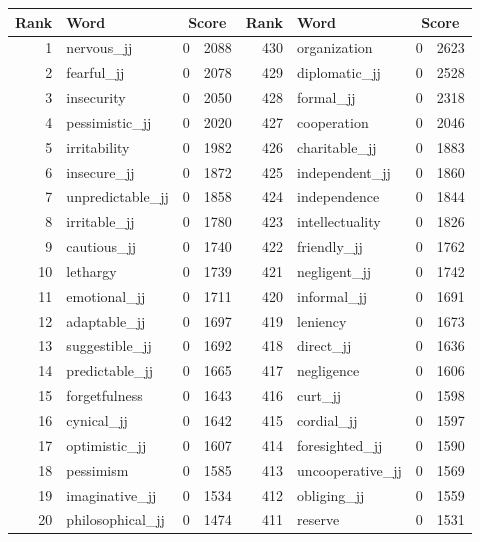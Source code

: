 \begin{table}[tbp]
    \begin{tabular}{| rlr@{.}l | rlr@{.}l |}
    \hline
    \textbf{Rank} & \textbf{Word} & \multicolumn{2}{c|}{\textbf{Score}} & \textbf{Rank} & \textbf{Word} & \multicolumn{2}{c|}{\textbf{Score}} \\
    \hline
    1 & nervous\_jj & 0 & 2088    &    430 & organization & 0 & 2623 \\
    2 & fearful\_jj & 0 & 2078    &    429 & diplomatic\_jj & 0 & 2528 \\
    3 & insecurity & 0 & 2050    &    428 & formal\_jj & 0 & 2318 \\
    4 & pessimistic\_jj & 0 & 2020    &    427 & cooperation & 0 & 2046 \\
    5 & irritability & 0 & 1982    &    426 & charitable\_jj & 0 & 1883 \\
    6 & insecure\_jj & 0 & 1872    &    425 & independent\_jj & 0 & 1860 \\
    7 & unpredictable\_jj & 0 & 1858    &    424 & independence & 0 & 1844 \\
    8 & irritable\_jj & 0 & 1780    &    423 & intellectuality & 0 & 1826 \\
    9 & cautious\_jj & 0 & 1740    &    422 & friendly\_jj & 0 & 1762 \\
    10 & lethargy & 0 & 1739    &    421 & negligent\_jj & 0 & 1742 \\
    11 & emotional\_jj & 0 & 1711    &    420 & informal\_jj & 0 & 1691 \\
    12 & adaptable\_jj & 0 & 1697    &    419 & leniency & 0 & 1673 \\
    13 & suggestible\_jj & 0 & 1692    &    418 & direct\_jj & 0 & 1636 \\
    14 & predictable\_jj & 0 & 1665    &    417 & negligence & 0 & 1606 \\
    15 & forgetfulness & 0 & 1643    &    416 & curt\_jj & 0 & 1598 \\
    16 & cynical\_jj & 0 & 1642    &    415 & cordial\_jj & 0 & 1597 \\
    17 & optimistic\_jj & 0 & 1607    &    414 & foresighted\_jj & 0 & 1590 \\
    18 & pessimism & 0 & 1585    &    413 & uncooperative\_jj & 0 & 1569 \\
    19 & imaginative\_jj & 0 & 1534    &    412 & obliging\_jj & 0 & 1559 \\
    20 & philosophical\_jj & 0 & 1474    &    411 & reserve & 0 & 1531 \\

\end{tabular}
\end{table}
